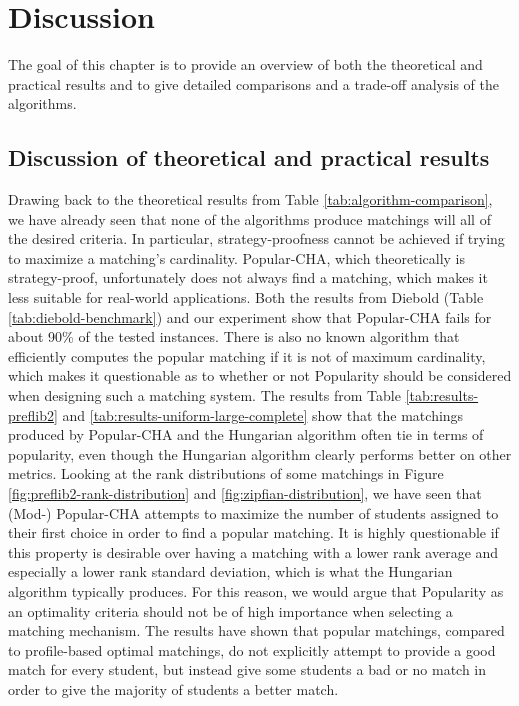 \section{Discussion}

The goal of this chapter is to provide an overview of both the theoretical and practical results and to give detailed comparisons and a trade-off analysis of the algorithms.

\subsection{Discussion of theoretical and practical results}
Drawing back to the theoretical results from Table \ref{tab:algorithm-comparison}, we have already seen that none of the algorithms produce matchings will all of the desired criteria. In particular, strategy-proofness cannot be achieved if trying to maximize a matching's cardinality. Popular-CHA, which theoretically is strategy-proof, unfortunately does not always find a matching, which makes it less suitable for real-world applications. Both the results from Diebold (Table \ref{tab:diebold-benchmark}) and our experiment show that Popular-CHA fails for about 90\% of the tested instances. There is also no known algorithm that efficiently computes the popular matching if it is not of maximum cardinality, which makes it questionable as to whether or not Popularity should be considered when designing such a matching system. The results from Table \ref{tab:results-preflib2} and \ref{tab:results-uniform-large-complete} show that the matchings produced by Popular-CHA and the Hungarian algorithm often tie in terms of popularity, even though the Hungarian algorithm clearly performs better on other metrics. Looking at the rank distributions of some matchings in Figure \ref{fig:preflib2-rank-distribution} and \ref{fig:zipfian-distribution}, we have seen that (Mod-) Popular-CHA attempts to maximize the number of students assigned to their first choice in order to find a popular matching. It is highly questionable if this property is desirable over having a matching with a lower rank average and especially a lower rank standard deviation, which is what the Hungarian algorithm typically produces. For this reason, we would argue that Popularity as an optimality criteria should not be of high importance when selecting a matching mechanism. The results have shown that popular matchings, compared to profile-based optimal matchings, do not explicitly attempt to provide a good match for every student, but instead give some students a bad or no match in order to give the majority of students a better match.

